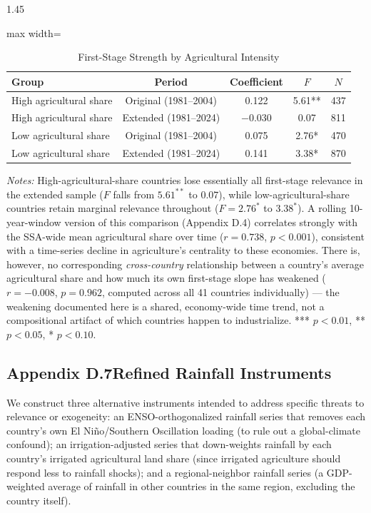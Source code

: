 \documentclass[12pt]{article}
\begin{document}
\begin{bibunit}[jpe]
\begin{spacing}{1.45}
\begin{table}[H]
\centering
\begin{adjustbox}{max width=\textwidth}
\begin{threeparttable}
\caption{First-Stage Strength by Agricultural Intensity}
\label{tab:D6}
\begin{tabular}{lcccc}
\toprule
Group & Period & Coefficient & $F$ & $N$ \\
\midrule
High agricultural share & Original (1981--2004) & 0.122 & 5.61**  & 437 \\
High agricultural share & Extended (1981--2024) & $-$0.030 & 0.07 & 811 \\
Low agricultural share  & Original (1981--2004) & 0.075 & 2.76*   & 470 \\
Low agricultural share  & Extended (1981--2024) & 0.141 & 3.38*   & 870 \\
\bottomrule
\end{tabular}
\begin{tablenotes}[flushleft]
\footnotesize
\item \textit{Notes:} High-agricultural-share countries lose essentially all first-stage relevance in the extended sample ($F$ falls from $5.61^{**}$ to $0.07$), while low-agricultural-share countries retain marginal relevance throughout ($F=2.76^{*}$ to $3.38^{*}$). A rolling 10-year-window version of this comparison (Appendix D.4) correlates strongly with the SSA-wide mean agricultural share over time ($r=0.738$, $p<0.001$), consistent with a time-series decline in agriculture's centrality to these economies. There is, however, no corresponding \emph{cross-country} relationship between a country's average agricultural share and how much its own first-stage slope has weakened ($r=-0.008$, $p=0.962$, computed across all 41 countries individually) --- the weakening documented here is a shared, economy-wide time trend, not a compositional artifact of which countries happen to industrialize. *** $p<0.01$, ** $p<0.05$, * $p<0.10$.
\end{tablenotes}
\end{threeparttable}
\end{adjustbox}
\end{table}

\subsection*{Appendix D.7\quad Refined Rainfall Instruments}

We construct three alternative instruments intended to address specific threats to relevance or exogeneity: an ENSO-orthogonalized rainfall series that removes each country's own El Ni\~no/Southern Oscillation loading (to rule out a global-climate confound); an irrigation-adjusted series that down-weights rainfall by each country's irrigated agricultural land share (since irrigated agriculture should respond less to rainfall shocks); and a regional-neighbor rainfall series (a GDP-weighted average of rainfall in other countries in the same region, excluding the country itself).


\end{spacing}
\end{bibunit}
\end{document}
